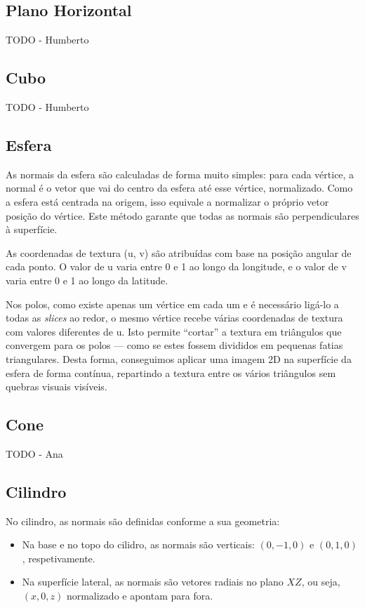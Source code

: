 \documentclass[12pt, a4paper]{article}
\begin{document}
\subsection{Plano Horizontal}

{\color{red} TODO - Humberto}

\subsection{Cubo}

{\color{red} TODO - Humberto}

\subsection{Esfera}

As normais da esfera são calculadas de forma muito simples: para cada vértice, a normal é o vetor
que vai do centro da esfera até esse vértice, normalizado. Como a esfera está centrada na origem,
isso equivale a normalizar o próprio vetor posição do vértice. Este método garante que todas as
normais são perpendiculares à superfície.

As coordenadas de textura (u, v) são atribuídas com base na posição angular de cada ponto. O valor
de u varia entre 0 e 1 ao longo da longitude, e o valor de v varia entre 0 e 1 ao longo da latitude.

Nos polos, como existe apenas um vértice em cada um e é necessário ligá-lo a todas as \emph{slices}
ao redor, o mesmo vértice recebe várias coordenadas de textura com valores diferentes de u.
Isto permite ``cortar'' a textura em triângulos que convergem para os polos — como se estes fossem
divididos em pequenas fatias triangulares.
Desta forma, conseguimos aplicar uma imagem 2D na superfície da esfera de forma contínua, repartindo
a textura entre os vários triângulos sem quebras visuais visíveis.

\subsection{Cone}

{\color{red} TODO - Ana}

\subsection{Cilindro}

No cilindro, as normais são definidas conforme a sua geometria:

\begin{itemize}
    \item Na base e no topo do cilidro, as normais são verticais: $(0, -1, 0)$ e $(0, 1, 0)$,
    respetivamente.
    \item Na superfície lateral, as normais são vetores radiais no plano $XZ$, ou seja, $(x, 0, z)$
    normalizado e apontam para fora.
\end{itemize}
\end{document}
